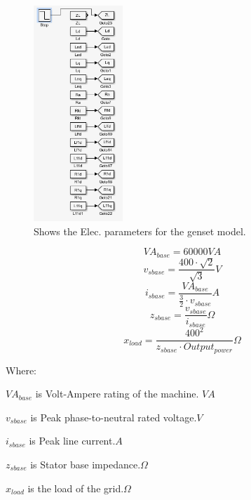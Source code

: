 \begin{figure}[H]
\centering
\includegraphics[width=0.3\textwidth]{rapport/billeder/simulink_elec_parameters}
\caption{Shows the Elec. parameters for the genset model. }
\label{fig:simulink_puOpenLoopDamper}
\end{figure}

\begin{equation}
VA_{base} = 60000 \unit{VA}
\end{equation}
\begin{equation}
v_{sbase} = \frac {400 \cdot \sqrt{2}}{\sqrt{3}} \unit{V}
\end{equation}
\begin{equation}
i_{sbase} = \frac {VA_{base}}  {\frac {3}{2} \cdot v_{sbase}} \unit{A}
\end{equation}
\begin{equation}
z_{sbase} = \frac {v_{sbase}}{i_{sbase}} \unit{\Omega}
\end{equation}
\begin{equation}
x_{load} = \frac {400^2}{z_{sbase}\cdot Output_{power}} \unit{\Omega}
\end{equation}

Where:

$VA_{base}$ is Volt-Ampere rating of the machine. $\unit{VA}$

$v_{sbase}$ is Peak phase-to-neutral rated voltage.$\unit{V}$

$i_{sbase}$ is Peak line current.$\unit{A}$

$z_{sbase}$ is Stator base impedance.$\unit{\Omega}$

$x_{load}$ is the load of the grid.$\unit{\Omega}$

